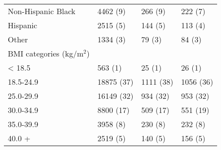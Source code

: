 \documentclass[
]{article}
\begin{document}
\begin{longtable}[t]{llll}
\hspace{1em}Non-Hispanic Black & 4462 (9) & 266 (9) & 222 (7)\\
\hspace{1em}Hispanic & 2515 (5) & 144 (5) & 113 (4)\\
\hspace{1em}Other & 1334 (3) & 79 (3) & 84 (3)\\
BMI categories (kg/m$^2$) &  &  & \\
\hspace{1em}< 18.5 & 563 (1) & 25 (1) & 26 (1)\\
\hspace{1em}18.5-24.9 & 18875 (37) & 1111 (38) & 1056 (36)\\
\hspace{1em}25.0-29.9 & 16149 (32) & 934 (32) & 953 (32)\\
\hspace{1em}30.0-34.9 & 8800 (17) & 509 (17) & 551 (19)\\
\hspace{1em}35.0-39.9 & 3958 (8) & 230 (8) & 232 (8)\\
\hspace{1em}40.0 + & 2519 (5) & 140 (5) & 156 (5)\\
\bottomrule
\end{longtable}

\clearpage
\newpage
\end{document}
